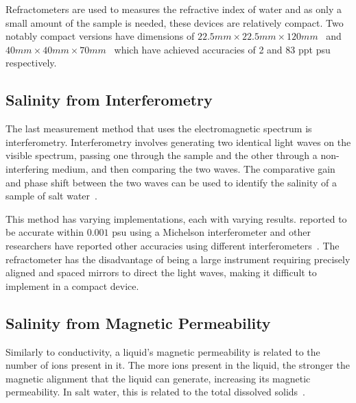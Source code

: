 Refractometers are used to measures the refractive index of water and as only a small amount of the sample is needed, these devices are relatively compact.
Two notably compact versions have dimensions of $22.5mm \times 22.5mm \times 120mm$~\cite{malarde_compact_refractometer_2008} and $40mm \times 40mm \times 70mm$~\cite{tengesdal_compact_refractometer_2012} which have achieved accuracies of 2 and 83 \gls{ppt} \gls{psu} respectively.

\subsection{Salinity from Interferometry}

The last measurement method that uses the electromagnetic spectrum is interferometry.
Interferometry involves generating two identical light waves on the visible spectrum, passing one through the sample and the other through a non-interfering medium, and then comparing the two waves.
The comparative gain and phase shift between the two waves can be used to identify the salinity of a sample of salt water~\cite{liao_interferometer_seawater_salinity_2023}.

This method has varying implementations, each with varying results.
 reported to be accurate within $0.001$ \gls{psu} using a Michelson interferometer and other researchers have reported other accuracies using different interferometers~\cite{possetti_interferometer_salinity_measurement_2009, nguyen_interferometer_salinity_measurement_2009, zhao_interferometer_salinity_measurement_2009}.
The refractometer has the disadvantage of being a large instrument requiring precisely aligned and spaced mirrors to direct the light waves, making it difficult to implement in a compact device. 

\subsection{Salinity from Magnetic Permeability}\label{subsec:salinity-from-electromagnetic-induction}

Similarly to conductivity, a liquid's magnetic permeability is related to the number of ions present in it.
The more ions present in the liquid, the stronger the magnetic alignment that the liquid can generate, increasing its magnetic permeability.
In salt water, this is related to the total dissolved solids~\cite{somaraju_electromagnetic_salinity_2006}.

